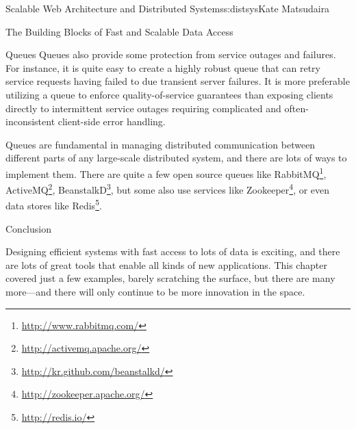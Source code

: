 \begin{aosachapter}{Scalable Web Architecture and Distributed Systems}{s:distsys}{Kate Matsudaira}
\begin{aosasect1}{The Building Blocks of Fast and Scalable Data Access}
\begin{aosasect2}{Queues}
Queues also provide some protection from service outages and
failures. For instance, it is quite easy to create a highly robust
queue that can retry service requests having failed to due transient
server failures. It is more preferable utilizing a queue to enforce
quality-of-service guarantees than exposing clients directly to
intermittent service outages requiring complicated and
often-inconsistent client-side error handling.


Queues are fundamental in managing distributed communication between
different parts of any large-scale distributed system, and there are
lots of ways to implement them. There are quite a few open source
queues like RabbitMQ\footnote{\url{http://www.rabbitmq.com/}},
ActiveMQ\footnote{\url{http://activemq.apache.org/}},
BeanstalkD\footnote{\url{http://kr.github.com/beanstalkd/}}, but some
also use services like
Zookeeper\footnote{\url{http://zookeeper.apache.org/}}, or even data
stores like Redis\footnote{\url{http://redis.io/}}.

\end{aosasect2}

\end{aosasect1}

\begin{aosasect1}{Conclusion}

Designing efficient systems with fast access to lots of data is
exciting, and there are lots of great tools that enable all kinds of
new applications. This chapter covered just a few examples, barely
scratching the surface, but there are many more—and there will only
continue to be more innovation in the space.

\end{aosasect1}

\end{aosachapter}
